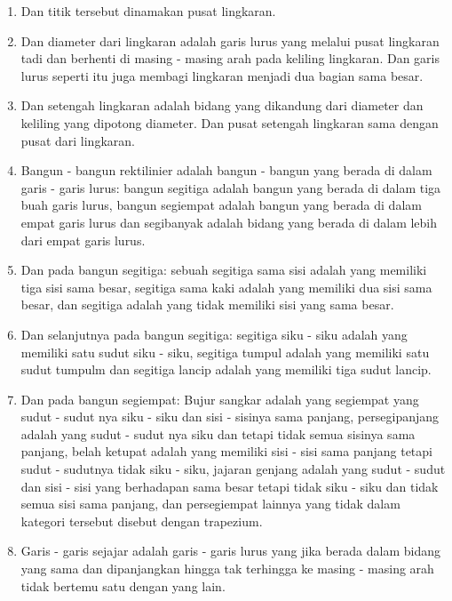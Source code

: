 \documentclass[a4paper]{book}
\begin{document}
\begin{enumerate}
\item Dan titik tersebut dinamakan pusat lingkaran.
\item Dan diameter dari lingkaran adalah garis lurus yang melalui 
pusat lingkaran tadi dan berhenti di masing - masing arah pada
keliling lingkaran. Dan garis lurus seperti itu juga membagi lingkaran 
menjadi dua bagian sama besar.
\item Dan setengah lingkaran adalah bidang yang dikandung dari diameter dan 
keliling yang dipotong diameter. Dan pusat setengah lingkaran sama dengan 
pusat dari lingkaran.
\item Bangun - bangun rektilinier adalah bangun - bangun yang berada di dalam
garis - garis lurus: bangun segitiga adalah bangun yang berada di dalam tiga buah
garis lurus, bangun segiempat adalah bangun yang berada di dalam empat garis lurus dan 
segibanyak adalah bidang yang berada di dalam lebih dari empat garis lurus.
\item Dan pada bangun segitiga: sebuah segitiga sama sisi adalah yang memiliki tiga
sisi sama besar, segitiga sama kaki adalah yang memiliki dua sisi sama besar, dan 
segitiga adalah yang tidak memiliki sisi yang sama besar.
\item Dan selanjutnya pada bangun segitiga: segitiga siku - siku adalah yang memiliki
satu sudut siku - siku, segitiga tumpul adalah yang memiliki satu sudut tumpulm dan 
segitiga lancip adalah yang memiliki tiga sudut lancip.
\item Dan pada bangun segiempat: Bujur sangkar adalah yang segiempat yang
sudut - sudut nya siku - siku dan sisi - sisinya sama panjang, persegipanjang
adalah yang sudut - sudut nya siku dan tetapi tidak semua sisinya sama panjang, 
belah ketupat adalah yang memiliki sisi - sisi sama panjang tetapi
sudut - sudutnya tidak siku - siku, jajaran genjang adalah yang sudut - sudut 
dan sisi - sisi yang berhadapan sama besar tetapi tidak siku - siku dan tidak 
semua sisi sama panjang, dan persegiempat lainnya yang tidak dalam kategori tersebut
disebut dengan trapezium.
\item Garis - garis sejajar adalah garis - garis lurus yang jika berada dalam 
bidang yang sama dan dipanjangkan hingga tak terhingga ke masing - masing arah
tidak bertemu satu dengan yang lain.  
\end{enumerate}
\end{document}
